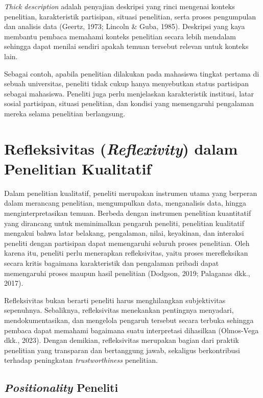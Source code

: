 \documentclass[
  indonesian,
  letterpaper,
  DIV=11,
  numbers=noendperiod]{scrreprt}
\begin{document}
\emph{Thick description} adalah penyajian deskripsi yang rinci mengenai
konteks penelitian, karakteristik partisipan, situasi penelitian, serta
proses pengumpulan dan analisis data (Geertz, 1973; Lincoln \& Guba,
1985). Deskripsi yang kaya membantu pembaca memahami konteks penelitian
secara lebih mendalam sehingga dapat menilai sendiri apakah temuan
tersebut relevan untuk konteks lain.

Sebagai contoh, apabila penelitian dilakukan pada mahasiswa tingkat
pertama di sebuah universitas, peneliti tidak cukup hanya menyebutkan
status partisipan sebagai mahasiswa. Peneliti juga perlu menjelaskan
karakteristik institusi, latar sosial partisipan, situasi penelitian,
dan kondisi yang memengaruhi pengalaman mereka selama penelitian
berlangsung.

\section{\texorpdfstring{Refleksivitas (\emph{Reflexivity}) dalam
Penelitian
Kualitatif}{Refleksivitas (Reflexivity) dalam Penelitian Kualitatif}}\label{refleksivitas-reflexivity-dalam-penelitian-kualitatif}

Dalam penelitian kualitatif, peneliti merupakan instrumen utama yang
berperan dalam merancang penelitian, mengumpulkan data, menganalisis
data, hingga menginterpretasikan temuan. Berbeda dengan instrumen
penelitian kuantitatif yang dirancang untuk meminimalkan pengaruh
peneliti, penelitian kualitatif mengakui bahwa latar belakang,
pengalaman, nilai, keyakinan, dan interaksi peneliti dengan partisipan
dapat memengaruhi seluruh proses penelitian. Oleh karena itu, peneliti
perlu menerapkan refleksivitas, yaitu proses merefleksikan secara kritis
bagaimana karakteristik dan pengalaman pribadi dapat memengaruhi proses
maupun hasil penelitian (Dodgson, 2019; Palaganas dkk., 2017).

Refleksivitas bukan berarti peneliti harus menghilangkan subjektivitas
sepenuhnya. Sebaliknya, refleksivitas menekankan pentingnya menyadari,
mendokumentasikan, dan mengelola pengaruh tersebut secara terbuka
sehingga pembaca dapat memahami bagaimana suatu interpretasi dihasilkan
(Olmos-Vega dkk., 2023). Dengan demikian, refleksivitas merupakan bagian
dari praktik penelitian yang transparan dan bertanggung jawab, sekaligus
berkontribusi terhadap peningkatan \emph{trustworthiness} penelitian.

\subsection{\texorpdfstring{\emph{Positionality}
Peneliti}{Positionality Peneliti}}\label{positionality-peneliti}
\end{document}
